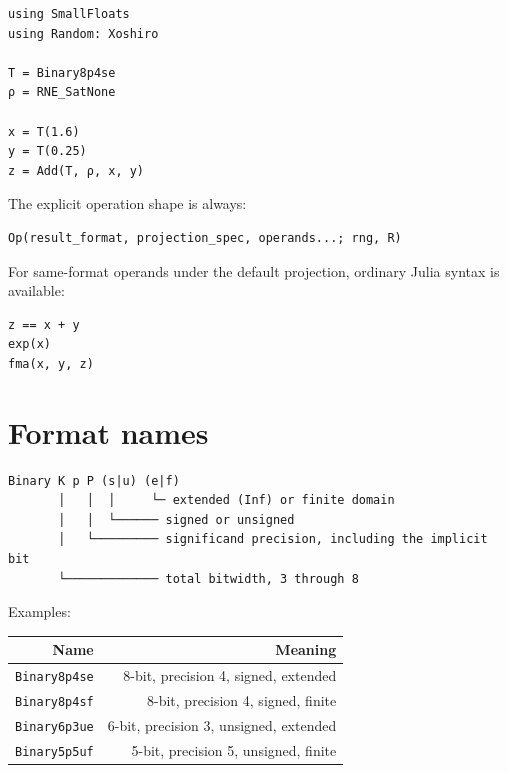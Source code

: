 \begin{verbatim}
using SmallFloats
using Random: Xoshiro

T = Binary8p4se
ρ = RNE_SatNone

x = T(1.6)
y = T(0.25)
z = Add(T, ρ, x, y)
\end{verbatim}



The explicit operation shape is always:




\begin{verbatim}
Op(result_format, projection_spec, operands...; rng, R)
\end{verbatim}



For same-format operands under the default projection, ordinary Julia syntax is available:




\begin{verbatim}
z == x + y
exp(x)
fma(x, y, z)
\end{verbatim}



\section{Format names}



\label{4610047011167023553}{}



\begin{verbatim}
Binary K p P (s|u) (e|f)
       │   │  │     └─ extended (Inf) or finite domain
       │   │  └────── signed or unsigned
       │   └───────── significand precision, including the implicit bit
       └───────────── total bitwidth, 3 through 8
\end{verbatim}



Examples:




\begin{table}[h]
\centering
\begin{tabulary}{\linewidth}{R R}
\toprule
Name & Meaning \\
\toprule
\texttt{Binary8p4se} & 8-bit, precision 4, signed, extended \\
\texttt{Binary8p4sf} & 8-bit, precision 4, signed, finite \\
\texttt{Binary6p3ue} & 6-bit, precision 3, unsigned, extended \\
\texttt{Binary5p5uf} & 5-bit, precision 5, unsigned, finite \\
\bottomrule
\end{tabulary}

\end{table}



